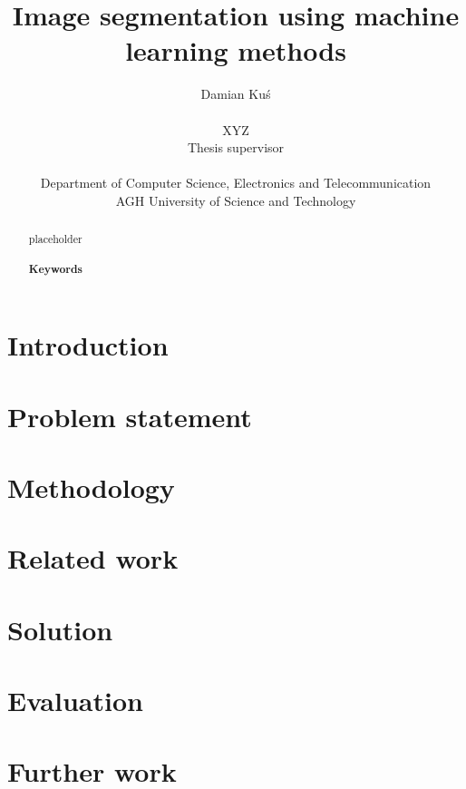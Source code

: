 \documentclass[11pt]{article}
\title{\textbf{	Image segmentation using machine learning methods}}
\author {
	Damian Kuś\\\\
	XYZ\\
	\small{Thesis supervisor}\\\\
	Department of Computer Science, Electronics and Telecommunication\\
	AGH University of Science and Technology
}
\begin{document}
\maketitle

\begin{abstract}
placeholder
\\
\\
\noindent \large \textbf{Keywords} \\

\end{abstract}


\section{Introduction}


\section{Problem statement}


\section{Methodology}


\section{Related work}


\section{Solution}

\section{Evaluation}


\section{Further work}

	
\begin{thebibliography}{9}

\end{thebibliography}
\end{document}
